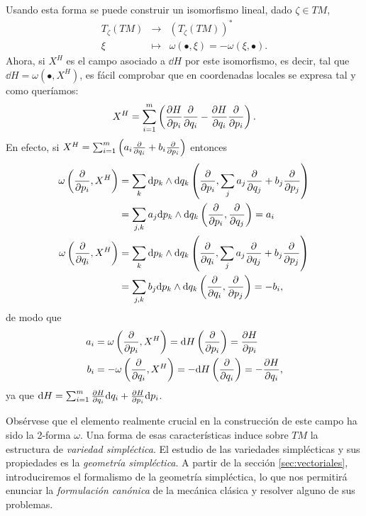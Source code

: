 Usando esta forma se puede construir un isomorfismo lineal, dado $\zeta \in TM$,
\begin{equation}
  \label{isomorfismo}
  \begin{array}{rcl}
     T_{\zeta}(TM) & \longrightarrow & (T_{\zeta}(TM))^* \\
    \xi & \longmapsto & \omega(\bullet,\xi)=-\omega(\xi, \bullet).
  \end{array}
\end{equation}
Ahora, si $X^H$ es el campo asociado a $\dd H$ por este isomorfismo, es decir, tal que $\dd H=\omega(\bullet,X^H)$, es fácil comprobar que en coordenadas locales se expresa tal y como queríamos:
\begin{equation*}
  X^H = \sum_{i=1}^m \left( \frac{\partial H}{\partial p_i} \frac{\partial}{\partial q_i} - \frac{\partial H}{\partial q_i} \frac{\partial}{\partial p_i} \right).
\end{equation*}
En efecto, si $X^H=\sum_{i=1}^m \left( a_i \frac{\partial}{\partial q_i} + b_i \frac{\partial}{\partial p_i} \right)$ entonces
\begin{align*}
  \omega\left(\frac{\partial}{\partial p_i},X^H\right)&=\sum_k\mathrm{d} p_k\wedge \mathrm{d} q_k\left( \frac{\partial}{\partial p_i},\sum_j a_j\frac{\partial}{\partial q_j}+b_j\frac{\partial}{\partial p_j} \right)\\ &=\sum_{j,k} a_j \mathrm{d} p_k \wedge \mathrm{d} q_k \left( \frac{\partial}{\partial p_i},\frac{\partial}{\partial q_j} \right)=a_i\\
  \omega\left(\frac{\partial}{\partial q_i},X^H\right)&=\sum_k\mathrm{d} p_k\wedge \mathrm{d} q_k\left( \frac{\partial}{\partial q_i},\sum_j a_j\frac{\partial}{\partial q_j}+b_j\frac{\partial}{\partial p_j} \right) \\ &=\sum_{j,k} b_j \mathrm{d} p_k \wedge \mathrm{d} q_k \left( \frac{\partial}{\partial q_i},\frac{\partial}{\partial p_j} \right)=-b_i,
\end{align*}
de modo que
\begin{align*}
  a_i&=\omega\left(\frac{\partial}{\partial p_i},X^H\right)=\mathrm{d} H\left( \frac{\partial}{\partial p_i} \right)=\frac{\partial H}{\partial p_i} \\
  b_i&=-\omega\left(\frac{\partial}{\partial q_i},X^H\right)=-\mathrm{d} H\left( \frac{\partial}{\partial q_i} \right)=-\frac{\partial H}{\partial q_i},
\end{align*}
ya que $\mathrm{d} H = \sum_{i=1}^m\frac{\partial H}{\partial q_i}\mathrm{d} q_i + \frac{\partial H}{\partial p_i}\mathrm{d} p_i$.

Obsérvese que el elemento realmente crucial en la construcción de este campo ha sido la 2-forma $\omega$. Una forma de esas características induce sobre $TM$ la estructura de \emph{variedad simpléctica}. El estudio de las variedades simplécticas y sus propiedades es la \emph{geometría simpléctica}. A partir de la sección \ref{sec:vectoriales}, introduciremos el formalismo de la geometría simpléctica, lo que nos permitirá enunciar la \emph{formulación canónica} de la mecánica clásica y resolver alguno de sus problemas.


